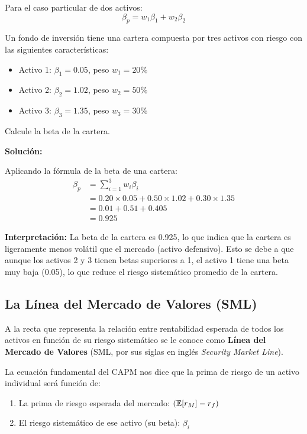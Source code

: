 Para el caso particular de dos activos:
\begin{equation}
\beta_p = w_1 \beta_1 + w_2 \beta_2
\end{equation}

\begin{ejemplo}
Un fondo de inversión tiene una cartera compuesta por tres activos con riesgo con las siguientes características:
\begin{itemize}
\item Activo 1: $\beta_1 = 0.05$, peso $w_1 = 20\%$
\item Activo 2: $\beta_2 = 1.02$, peso $w_2 = 50\%$
\item Activo 3: $\beta_3 = 1.35$, peso $w_3 = 30\%$
\end{itemize}

Calcule la beta de la cartera.

\textbf{Solución:}

Aplicando la fórmula de la beta de una cartera:
\begin{align*}
\beta_p &= \sum_{i=1}^{3} w_i \beta_i \\
&= 0.20 \times 0.05 + 0.50 \times 1.02 + 0.30 \times 1.35 \\
&= 0.01 + 0.51 + 0.405 \\
&= 0.925
\end{align*}

\textbf{Interpretación:} La beta de la cartera es 0.925, lo que indica que la cartera es ligeramente menos volátil que el mercado (activo defensivo). Esto se debe a que aunque los activos 2 y 3 tienen betas superiores a 1, el activo 1 tiene una beta muy baja (0.05), lo que reduce el riesgo sistemático promedio de la cartera.
\end{ejemplo}

\subsection{La Línea del Mercado de Valores (SML)}

\begin{definicion}
A la recta que representa la relación entre rentabilidad esperada de todos los activos en función de su riesgo sistemático se le conoce como \textbf{Línea del Mercado de Valores} (SML, por sus siglas en inglés \textit{Security Market Line}).
\end{definicion}

La ecuación fundamental del CAPM nos dice que la prima de riesgo de un activo individual será función de:
\begin{enumerate}
\item La prima de riesgo esperada del mercado: $(\mathbb{E}[r_M] - r_f)$
\item El riesgo sistemático de ese activo (su beta): $\beta_i$
\end{enumerate}

